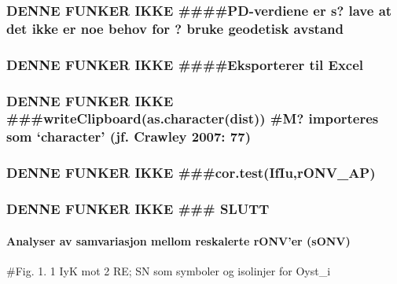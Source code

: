 \documentclass[]{article}
\let\oldparagraph\paragraph
\renewcommand{\paragraph}[1]{\oldparagraph{#1}\mbox{}}
\begin{document}
\hypertarget{denne-funker-ikke-pd-verdiene-er-s-lave-at-det-ikke-er-noe-behov-for-bruke-geodetisk-avstand-1}{%
\subsubsection{DENNE FUNKER IKKE \#\#\#\#PD-verdiene er s? lave at det
ikke er noe behov for ? bruke geodetisk
avstand}\label{denne-funker-ikke-pd-verdiene-er-s-lave-at-det-ikke-er-noe-behov-for-bruke-geodetisk-avstand-1}}

\hypertarget{denne-funker-ikke-eksporterer-til-excel-1}{%
\subsubsection{DENNE FUNKER IKKE \#\#\#\#Eksporterer til
Excel}\label{denne-funker-ikke-eksporterer-til-excel-1}}

\hypertarget{denne-funker-ikke-writeclipboardas.characterdist-m-importeres-som-character-jf.-crawley-2007-77-1}{%
\subsubsection{DENNE FUNKER IKKE
\#\#\#writeClipboard(as.character(dist)) \#M? importeres som `character'
(jf. Crawley 2007:
77)}\label{denne-funker-ikke-writeclipboardas.characterdist-m-importeres-som-character-jf.-crawley-2007-77-1}}

\hypertarget{denne-funker-ikke-cor.testifiuronv_ap}{%
\subsubsection{DENNE FUNKER IKKE
\#\#\#cor.test(IfIu,rONV\_AP)}\label{denne-funker-ikke-cor.testifiuronv_ap}}

\hypertarget{denne-funker-ikke-slutt}{%
\subsubsection{DENNE FUNKER IKKE \#\#\#
SLUTT}\label{denne-funker-ikke-slutt}}

\hypertarget{analyser-av-samvariasjon-mellom-reskalerte-ronver-sonv}{%
\paragraph{Analyser av samvariasjon mellom reskalerte rONV'er
(sONV)}\label{analyser-av-samvariasjon-mellom-reskalerte-ronver-sonv}}

\#Fig. 1. 1 IyK mot 2 RE; SN som symboler og isolinjer for Oyst\_i
\end{document}
